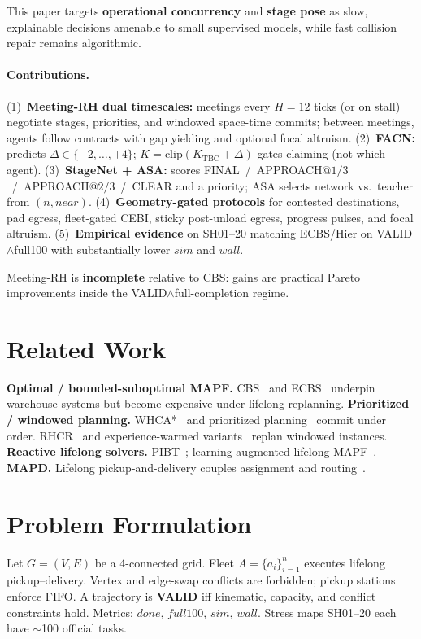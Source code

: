 \documentclass[11pt,a4paper]{article}
\begin{document}
This paper targets \textbf{operational concurrency} and \textbf{stage pose} as slow, explainable decisions amenable to small supervised models, while fast collision repair remains algorithmic.

\paragraph{Contributions.}
(1)~\textbf{Meeting-RH dual timescales:} meetings every $H{=}12$ ticks (or on stall) negotiate stages, priorities, and windowed space-time commits; between meetings, agents follow contracts with gap yielding and optional focal altruism.
(2)~\textbf{FACN:} predicts $\Delta\in\{-2,\ldots,+4\}$; $K=\mathrm{clip}(K_{\mathrm{TBC}}+\Delta)$ gates claiming (not which agent).
(3)~\textbf{StageNet + ASA:} scores FINAL~/~APPROACH@$1/3$~/~APPROACH@$2/3$~/~CLEAR and a priority; ASA selects network vs.\ teacher from $(n,\textit{near})$.
(4)~\textbf{Geometry-gated protocols} for contested destinations, pad egress, fleet-gated CEBI, sticky post-unload egress, progress pulses, and focal altruism.
(5)~\textbf{Empirical evidence} on SH01--20 matching ECBS/Hier on VALID$\land$full100 with substantially lower $\textit{sim}$ and $\textit{wall}$.

Meeting-RH is \textbf{incomplete} relative to CBS: gains are practical Pareto improvements inside the VALID$\land$full-completion regime.

\section{Related Work}
\textbf{Optimal / bounded-suboptimal MAPF.} CBS~\citep{sharon2015cbs} and ECBS~\citep{barer2014ecbs,pearl1982focal} underpin warehouse systems but become expensive under lifelong replanning.
\textbf{Prioritized / windowed planning.} WHCA*~\citep{silver2005whca} and prioritized planning~\citep{cap2015prioritized} commit under order. RHCR~\citep{li2021rhcr} and experience-warmed variants~\citep{madar2022exrhcr} replan windowed instances.
\textbf{Reactive lifelong solvers.} PIBT~\citep{okumura2022pibt}; learning-augmented lifelong MAPF~\citep{skrynnik2024follow,damani2021primal}.
\textbf{MAPD.} Lifelong pickup-and-delivery couples assignment and routing~\citep{ma2017mapd2,liu2019lifelong}.

\section{Problem Formulation}
Let $G=(V,E)$ be a 4-connected grid. Fleet $A=\{a_i\}_{i=1}^{n}$ executes lifelong pickup--delivery. Vertex and edge-swap conflicts are forbidden; pickup stations enforce FIFO. A trajectory is \textbf{VALID} iff kinematic, capacity, and conflict constraints hold. Metrics: $\textit{done}$, $\textit{full100}$, $\textit{sim}$, $\textit{wall}$. Stress maps SH01--20 each have $\sim$100 official tasks.
\end{document}
